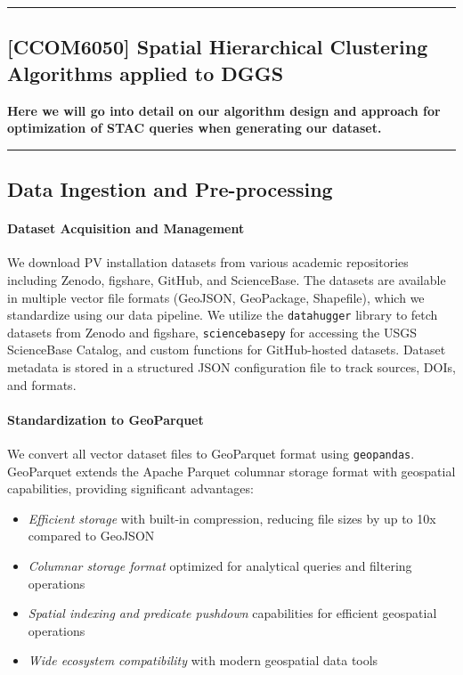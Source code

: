 {\color{gray}\hrule}
\begin{center}
\section{[CCOM6050] Spatial Hierarchical Clustering Algorithms applied to DGGS}
\textbf{Here we will go into detail on our algorithm design and approach for optimization of STAC queries when generating our dataset.}
\bigskip
\end{center}
{\color{gray}\hrule}

\begin{multicols}{2}

\subsection{Data Ingestion and Pre-processing}

\paragraph{Dataset Acquisition and Management} 
We download PV installation datasets from various academic repositories including Zenodo, figshare, GitHub, and ScienceBase. 
The datasets are available in multiple vector file formats (GeoJSON, GeoPackage, Shapefile), which we standardize using our data pipeline. 
We utilize the \texttt{datahugger} library to fetch datasets from Zenodo and figshare, \texttt{sciencebasepy} for accessing the USGS ScienceBase Catalog, 
and custom functions for GitHub-hosted datasets. Dataset metadata is stored in a structured JSON configuration file to track sources, DOIs, and formats. 

\paragraph{Standardization to GeoParquet}
We convert all vector dataset files to GeoParquet format using \texttt{geopandas}. GeoParquet extends the Apache Parquet columnar storage format with geospatial capabilities, providing significant advantages:
\begin{itemize}
    \item \textit{Efficient storage} with built-in compression, reducing file sizes by up to 10x compared to GeoJSON
    \item \textit{Columnar storage format} optimized for analytical queries and filtering operations
    \item \textit{Spatial indexing and predicate pushdown} capabilities for efficient geospatial operations
    \item \textit{Wide ecosystem compatibility} with modern geospatial data tools
\end{itemize}


\end{multicols}
